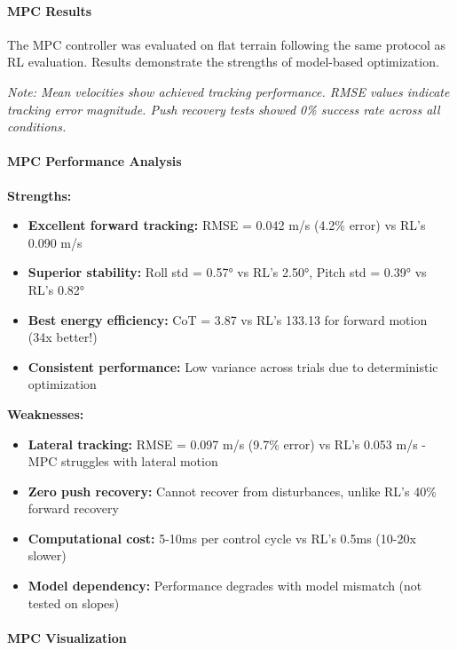 \documentclass[12pt,a4paper]{article}
\begin{document}
\paragraph{MPC Results}

The MPC controller was evaluated on flat terrain following the same protocol as RL evaluation. Results demonstrate the strengths of model-based optimization.

\textit{Note: Mean velocities show achieved tracking performance. RMSE values indicate tracking error magnitude. Push recovery tests showed 0\% success rate across all conditions.}

\paragraph{MPC Performance Analysis}

\textbf{Strengths:}
\begin{itemize}
    \item \textbf{Excellent forward tracking:} RMSE = 0.042 m/s (4.2\% error) vs RL's 0.090 m/s
    \item \textbf{Superior stability:} Roll std = 0.57° vs RL's 2.50°, Pitch std = 0.39° vs RL's 0.82°
    \item \textbf{Best energy efficiency:} CoT = 3.87 vs RL's 133.13 for forward motion (34x better!)
    \item \textbf{Consistent performance:} Low variance across trials due to deterministic optimization
\end{itemize}

\textbf{Weaknesses:}
\begin{itemize}
    \item \textbf{Lateral tracking:} RMSE = 0.097 m/s (9.7\% error) vs RL's 0.053 m/s - MPC struggles with lateral motion
    \item \textbf{Zero push recovery:} Cannot recover from disturbances, unlike RL's 40\% forward recovery
    \item \textbf{Computational cost:} 5-10ms per control cycle vs RL's 0.5ms (10-20x slower)
    \item \textbf{Model dependency:} Performance degrades with model mismatch (not tested on slopes)
\end{itemize}



\paragraph{MPC Visualization}
\end{document}

